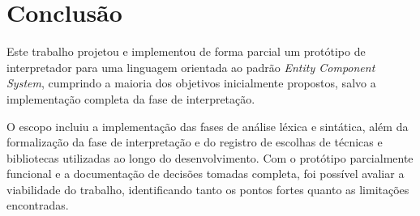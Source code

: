 






\chapter{Conclusão} \label{ch:conclusao}

Este trabalho projetou e implementou de forma parcial um protótipo de interpretador para uma linguagem orientada ao padrão \textit{Entity Component System}, cumprindo a maioria dos objetivos inicialmente propostos, salvo a implementação completa da fase de interpretação.

O escopo incluiu a implementação das fases de análise léxica e sintática, além da formalização da fase de interpretação e do registro de escolhas de técnicas e bibliotecas utilizadas ao longo do desenvolvimento. Com o protótipo parcialmente funcional e a documentação de decisões tomadas completa, foi possível avaliar a viabilidade do trabalho, identificando tanto os pontos fortes quanto as limitações encontradas.

